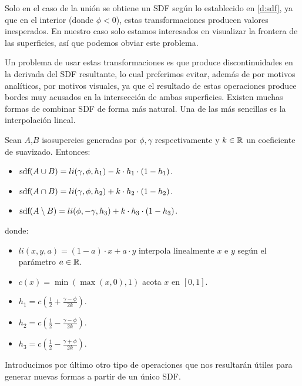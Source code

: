 \begin{observacion}
    Solo en el caso de la unión se obtiene un SDF según lo establecido en \autoref{d:sdf}, ya que en el interior (donde $\phi < 0$), estas transformaciones producen valores inesperados. En nuestro caso solo estamos interesados en visualizar la frontera de las superficies, así que podemos obviar este problema.
\end{observacion}

Un problema de usar estas transformaciones es que produce discontinuidades en la derivada del SDF resultante, lo cual preferimos evitar, además de por motivos analíticos, por motivos visuales, ya que el resultado de estas operaciones produce bordes muy acusados en la intersección de ambas superficies. Existen muchas formas de combinar SDF de forma más natural. Una de las más sencillas es la interpolación lineal.

\begin{proposicion}
    Sean $A$,$B$ isosupercies generadas por $\phi,\gamma$ respectivamente y $k\in \mathbb{R}$ un coeficiente de suavizado. Entonces:
    \begin{itemize}
        \item $\text{sdf}(A\cup B) = li(\gamma, \phi, h_1) - k\cdot h_1 \cdot (1-h_1)$.
        \item $\text{sdf}(A\cap B) = li(\gamma, \phi, h_2) + k\cdot h_2 \cdot (1-h_2)$.
        \item $\text{sdf}(A\setminus B) = li(\phi, -\gamma, h_3) + k\cdot h_3 \cdot (1-h_3)$.
    \end{itemize}

    donde:
    \begin{itemize}
        \item $li(x,y,a) = (1-a)\cdot x + a\cdot y$ interpola linealmente $x$ e $y$ según el parámetro $a\in\mathbb{R}$.
        \item $c(x) = \min(\max(x, 0), 1)$ acota $x$ en $[0,1]$.
        \item $h_1 = c\left(\frac{1}{2} + \frac{\gamma - \phi}{2k}\right)$.
        \item $h_2 = c\left( \frac{1}{2} - \frac{\gamma - \phi}{2k} \right)$.
        \item $h_3 = c\left( \frac{1}{2} - \frac{\gamma + \phi}{2k}\right)$.
    \end{itemize}
\end{proposicion}

Introducimos por último otro tipo de operaciones que nos resultarán útiles para generar nuevas formas a partir de un único SDF.

